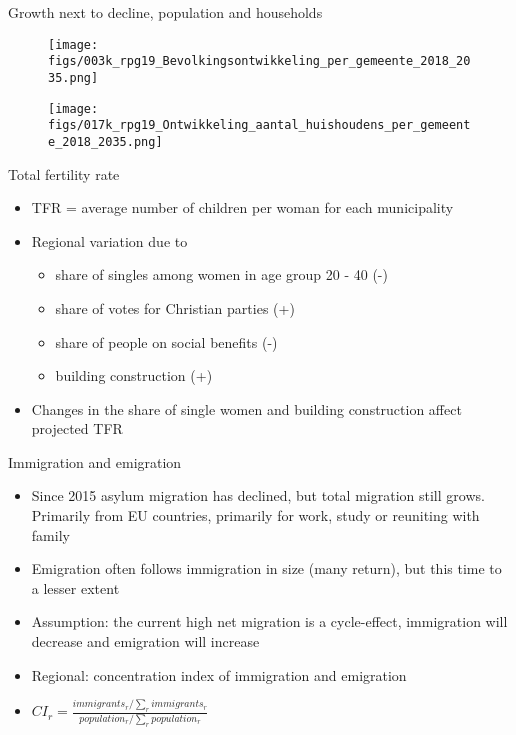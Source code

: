 \documentclass[final, 12pt, aspectratio=169, xcolor={dvipsnames}]{beamer}
\newcommand*{\figs}{../figs}%
\begin{document}
\begin{frame}{Growth next to decline, population and households}
  \begin{minipage}[t]{0.48\linewidth}%
    \begin{figure}
      \texttt{[image: \\figs/003k\_rpg19\_Bevolkingsontwikkeling\_per\_gemeente\_2018\_2035.png]}
    \end{figure}
  \end{minipage}
  \begin{minipage}[t]{0.48\linewidth}
    \begin{figure}
      \texttt{[image: \\figs/017k\_rpg19\_Ontwikkeling\_aantal\_huishoudens\_per\_gemeente\_2018\_2035.png]}
  \end{figure}
    \end{minipage}
\end{frame}



\begin{frame}{Total fertility rate}
  \begin{itemize}
  \item TFR = average number of children per woman for each municipality
  \item Regional variation due to
    \begin{itemize}
    \item share of singles among women in age group 20 - 40 (-)
    \item share of votes for Christian parties (+)
    \item share of people on social benefits (-)
      \item building construction (+)
    \end{itemize}
    \item Changes in the share of single women and building construction affect projected TFR
    \end{itemize}
  
  \end{frame}

\begin{frame}{Immigration and emigration}
  \begin{itemize}
  \item Since 2015 asylum migration has declined, but total migration still grows. Primarily from EU countries, primarily for work, study or reuniting with family
  \item Emigration often follows immigration in size (many return), but this time to a lesser extent
  \item Assumption: the current high net migration is a cycle-effect, immigration will decrease and emigration will increase
  \item Regional: concentration index of immigration and emigration
    \item $CI_{r} = \frac{immigrants_{r} / \sum_{r} immigrants_{r}}{population_{r} / \sum_{r} population_{r}}$
    \end{itemize}
  \end{frame}
\end{document}
